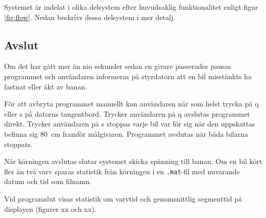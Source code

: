 Systemet är indelat i olika delsystem efter huvudsaklig funktionalitet enligt figur
\ref{fig:flow}. Nedan beskrivs dessa delsystem i mer detalj.






\subsection{Avslut}

Om det har gått mer än nio sekunder sedan en givare passerades pausas programmet
och användaren informeras på styrdatorn att en bil misstänkts ha fastnat eller
åkt av banan. 

För att avbryta programmet manuellt kan användaren när som helst trycka på q
eller s på datorns tangentbord. Trycker användaren på q avslutas programmet
direkt. Trycker användaren på s stoppas varje bil var för sig när den uppskattas
befinna sig 80~cm framför målgivaren. Programmet avslutas när båda bilarna
stoppats.

När körningen avslutas slutar systemet skicka spänning till banan.
Om en bil kört fler än två varv sparas statistik från körningen i en
\texttt{.mat}-fil med nuvarande datum och tid som filnamn.

Vid programslut visas statistik om varvtid och genomsnittlig segmenttid på
displayen (figurer xx och xx).

